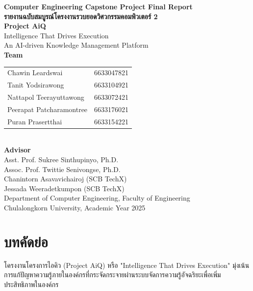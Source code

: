 \documentclass[12pt]{article}
\begin{document}
\begin{center}
    {\large\bfseries Computer Engineering Capstone Project Final Report}\\[1pc]
    {\Large\bfseries รายงานฉบับสมบูรณ์โครงงานรวบยอดวิศวกรรมคอมพิวเตอร์ 2}\\[2pc]

    {\Large\bfseries Project AiQ}\\[0.5pc]
    {\large Intelligence That Drives Execution}\\[0.5pc]
    {\large An AI-driven Knowledge Management Platform}\\[2pc]

    {\large\bfseries Team}\\[0.5pc]
    \begin{tabular}{ll}
        Chawin Leardswai & 6633047821 \\
        Tanit Yodsirawong & 6633104921 \\
        Nattapol Teerayuttawong & 6633072421 \\
        Peerapat Patcharamontree & 6633176021 \\
        Puran Prasertthai & 6633154221 \\
    \end{tabular}\\[2pc]

    {\large\bfseries Advisor}\\[0.5pc]
    Asst. Prof. Sukree Sinthupinyo, Ph.D. \\
    Assoc. Prof. Twittie Senivongse, Ph.D. \\
    Chanintorn Asavavichairoj (SCB TechX) \\
    Jessada Weeradetkumpon (SCB TechX) \\[2pc]

    Department of Computer Engineering, Faculty of Engineering\\
    Chulalongkorn University, Academic Year 2025
\end{center}

\newpage

\section*{บทคัดย่อ}
โครงงานโครงการไอคิว (Project AiQ) หรือ "Intelligence That Drives Execution" มุ่งเน้นการแก้ปัญหาความรู้ภายในองค์กรที่กระจัดกระจายผ่านระบบจัดการความรู้อัจฉริยะเพื่อเพิ่มประสิทธิภาพในองค์กร
\end{document}
